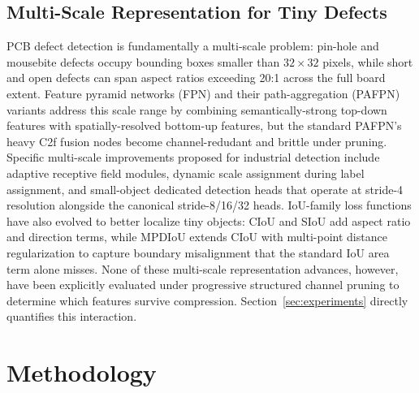 \documentclass[conference]{IEEEtran}
\begin{document}
\subsection{Multi-Scale Representation for Tiny Defects}
PCB defect detection is fundamentally a multi-scale problem: pin-hole and mousebite defects occupy bounding boxes smaller than $32\times32$ pixels, while short and open defects can span aspect ratios exceeding 20:1 across the full board extent. Feature pyramid networks (FPN) and their path-aggregation (PAFPN) variants address this scale range by combining semantically-strong top-down features with spatially-resolved bottom-up features, but the standard PAFPN's heavy C2f fusion nodes become channel-redudant and brittle under pruning. Specific multi-scale improvements proposed for industrial detection include adaptive receptive field modules, dynamic scale assignment during label assignment, and small-object dedicated detection heads that operate at stride-4 resolution alongside the canonical stride-8/16/32 heads. IoU-family loss functions have also evolved to better localize tiny objects: CIoU and SIoU add aspect ratio and direction terms, while MPDIoU extends CIoU with multi-point distance regularization to capture boundary misalignment that the standard IoU area term alone misses. None of these multi-scale representation advances, however, have been explicitly evaluated under progressive structured channel pruning to determine which features survive compression. Section~\ref{sec:experiments} directly quantifies this interaction.

\section{Methodology}
\label{sec:methodology}
\end{document}
